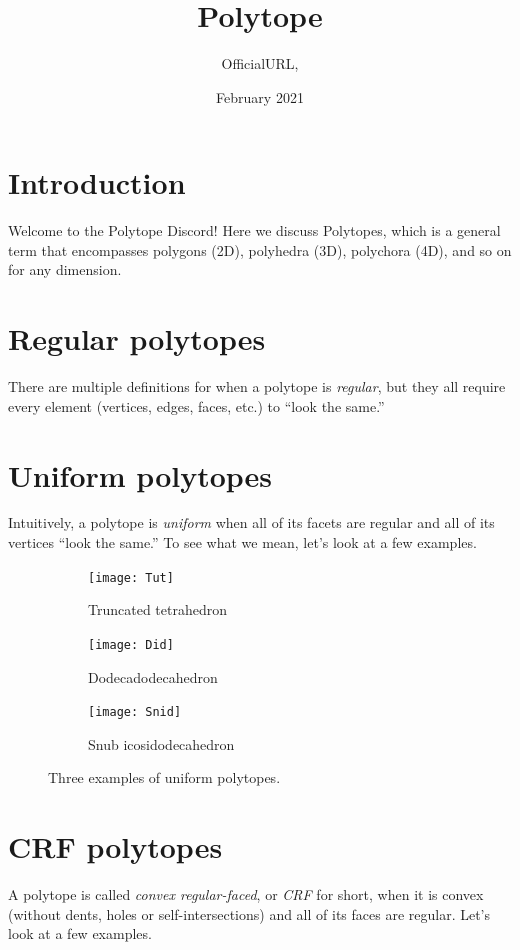 \documentclass{article}
\title{Polytope}
\author{OfficialURL, }
\date{February 2021}
\begin{document}
\maketitle

\section{Introduction}
Welcome to the Polytope Discord! Here we discuss Polytopes, which is a general term that encompasses polygons (2D), polyhedra (3D), polychora (4D), and so on for any dimension.

\section{Regular polytopes}
There are multiple definitions for when a polytope is \textit{regular}, but they all require every element (vertices, edges, faces, etc.) to ``look the same.''

\section{Uniform polytopes}
Intuitively, a polytope is \textit{uniform} when all of its facets are regular and all of its vertices ``look the same.'' To see what we mean, let's look at a few examples.

\begin{figure}[h]
\centering
\begin{subfigure}{.33333\textwidth}
  \centering
  \texttt{[image: Tut]}
  \caption{Truncated tetrahedron}
  \label{fig:tut}
\end{subfigure}%
\begin{subfigure}{.33333\textwidth}
  \centering
  \texttt{[image: Did]}
  \caption{Dodecadodecahedron}
  \label{fig:did}
\end{subfigure}%
\begin{subfigure}{.33333\textwidth}
  \centering
  \texttt{[image: Snid]}
  \caption{Snub icosidodecahedron}
  \label{fig:snid}
\end{subfigure}%
\caption{Three examples of uniform polytopes.}
\label{fig:polyhedra}
\end{figure}

\section{CRF polytopes}
A polytope is called \textit{convex regular-faced}, or \textit{CRF} for short, when it is convex (without dents, holes or self-intersections) and all of its faces are regular. Let's look at a few examples.
\end{document}

